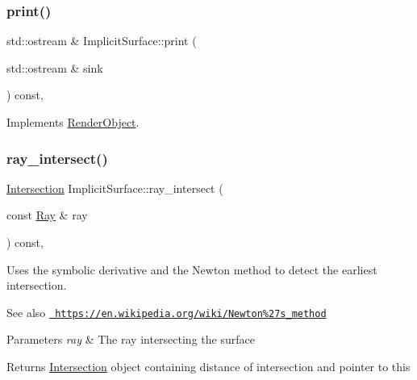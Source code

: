 \subsubsection{\texorpdfstring{print()}{print()}}
{\footnotesize\ttfamily std\+::ostream \& Implicit\+Surface\+::print (\begin{DoxyParamCaption}\item[{std\+::ostream \&}]{sink }\end{DoxyParamCaption}) const\hspace{0.3cm}{\ttfamily [override]}, {\ttfamily [virtual]}}



Implements \mbox{\hyperlink{classRenderObject_a7a7f1168a7d96ca95235b170ff7fb11b}{Render\+Object}}.

\mbox{\label{classImplicitSurface_ad9443ffe39f5c3d65e009aa2dbda81f0}} 
\subsubsection{\texorpdfstring{ray\_intersect()}{ray\_intersect()}}
{\footnotesize\ttfamily \mbox{\hyperlink{classIntersection}{Intersection}} Implicit\+Surface\+::ray\+\_\+intersect (\begin{DoxyParamCaption}\item[{const \mbox{\hyperlink{classRay}{Ray}} \&}]{ray }\end{DoxyParamCaption}) const\hspace{0.3cm}{\ttfamily [override]}, {\ttfamily [virtual]}}



Uses the symbolic derivative and the Newton method to detect the earliest intersection. 

\begin{DoxySeeAlso}{See also}
\href{https://en.wikipedia.org/wiki/Newton%27s_method}{\texttt{ https\+://en.\+wikipedia.\+org/wiki/\+Newton\%27s\+\_\+method}} 
\end{DoxySeeAlso}

\begin{DoxyParams}{Parameters}
{\em ray} & The ray intersecting the surface \\
\hline
\end{DoxyParams}
\begin{DoxyReturn}{Returns}
\mbox{\hyperlink{classIntersection}{Intersection}} object containing distance of intersection and pointer to this 
\end{DoxyReturn}


